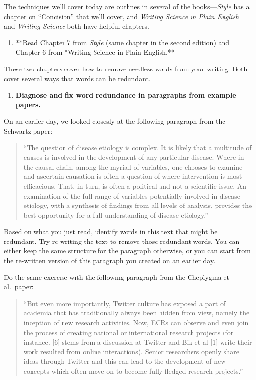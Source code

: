 \documentclass[]{tufte-book}
\providecommand{\tightlist}{%
  \setlength{\itemsep}{0pt}\setlength{\parskip}{0pt}}
\begin{document}
The techniques we'll cover today are outlines in several of the books---\emph{Style} has
a chapter on ``Concision'' that we'll cover, and \emph{Writing Science in Plain English} and
\emph{Writing Science} both have helpful chapters.

\begin{enumerate}
\def\labelenumi{\arabic{enumi}.}
\tightlist
\item
  **Read Chapter 7 from \emph{Style} (same chapter in the second edition) and Chapter 6 from *Writing Science in Plain English.**
\end{enumerate}

These two chapters cover how to remove needless words from your writing. Both cover
several ways that words can be redundant.

\begin{enumerate}
\def\labelenumi{\arabic{enumi}.}
\setcounter{enumi}{1}
\tightlist
\item
  \textbf{Diagnose and fix word redundance in paragraphs from example papers.}
\end{enumerate}

On an earlier day, we looked closesly at the following paragraph from the Schwartz
paper:

\begin{quote}
``The question of disease etiology is complex. It is likely that a multitude of
causes is involved in the development of any particular disease. Where in the
causal chain, among the myriad of variables, one chooses to examine and
ascertain causation is often a question of where intervention is most
efficacious. That, in turn, is often a political and not a scientific issue. An
examination of the full range of variables potentially involved in disease
etiology, with a synthesis of findings from all levels of analysis, provides the
best opportunity for a full understanding of disease etiology.''
\end{quote}

Based on what you just read, identify words in this text that might be redundant.
Try re-writing the text to remove those redundant words. You can either keep the
same structure for the paragraph otherwise, or you can start from the re-written
version of this paragraph you created on an earlier day.

Do the same exercise with the following paragraph from the Cheplygina et al.~paper:

\begin{quote}
``But even more importantly, Twitter culture has exposed a part of academia
that has traditionally always been hidden from view, namely the inception of new
research activities. Now, ECRs can observe and even join the process of creating
national or international research projects (for instance, {[}6{]} stems from a
discussion at Twitter and Bik et al {[}1{]} write their work resulted from online
interactions). Senior researchers openly share ideas through Twitter and this
can lead to the development of new concepts which often move on to become
fully-fledged research projects.''
\end{quote}
\end{document}
